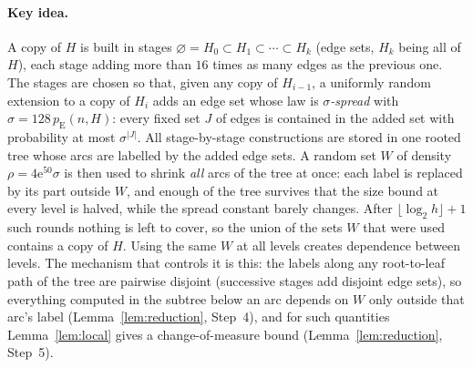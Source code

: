 \documentclass[11pt]{article}
\numberwithin{equation}{section}
\newcommand{\pE}{p_{\mathrm E}}
\newcommand{\ee}{\mathrm e}
\begin{document}
\paragraph{Key idea.}
A copy of $H$ is built in stages
$\varnothing=H_0\subset H_1\subset\cdots\subset H_k$ (edge sets, $H_k$
being all of $H$), each stage adding more than $16$ times as many edges
as the previous one. The stages are chosen so that, given any copy of
$H_{i-1}$, a uniformly random extension to a copy of $H_i$ adds an edge
set whose law is \emph{$\sigma$-spread} with $\sigma=128\,\pE(n,H)$:
every fixed set $J$ of edges is contained in the added set with
probability at most $\sigma^{|J|}$. All stage-by-stage constructions are
stored in one rooted tree whose arcs are labelled by the added edge
sets. A random set $W$ of density $\rho=4\ee^{50}\sigma$ is then used
to shrink \emph{all} arcs of the tree at once: each label is replaced by
its part outside $W$, and enough of the tree survives that the size
bound at every level is halved, while the spread constant barely
changes. After $\lfloor\log_2 h\rfloor+1$ such rounds nothing is left
to cover, so the union of the sets $W$ that were used contains a copy of
$H$. Using the same $W$ at all levels creates dependence between
levels. The mechanism that controls it is this: the labels along any
root-to-leaf path of the tree are pairwise disjoint (successive stages
add disjoint edge sets), so everything computed in the subtree below an
arc depends on $W$ only outside that arc's label
(Lemma~\ref{lem:reduction}, Step~4), and for such quantities
Lemma~\ref{lem:local} gives a change-of-measure bound
(Lemma~\ref{lem:reduction}, Step~5).
\end{document}
